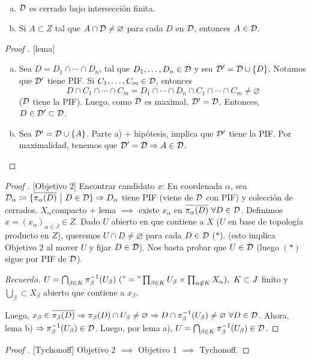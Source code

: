\begin{lemma}~
	\begin{enumerate}[a.]
		\item $\mathcal{D}$ es cerrado bajo intersección finita.

		\item Si $A \subset Z$ tal que $A \cap \mathcal{D} \neq \varnothing$ para cada $D$ en $\mathcal{D}$, entonces $A \in \mathcal{D}$.
	\end{enumerate}
\end{lemma}
\begin{proof}[Proof ][lema]
	\hfill{}
	\begin{enumerate}[a.]
		\item Sea $D = D_{1} \cap \cdots \cap D_{n}$, tal que $D_{1},\dots,D_{n} \in \mathcal{D}$ y sea $\mathcal{D}' = \mathcal{D} \cup \{D\}$. Notamos que $\mathcal{D}'$ tiene PIF. Si $C_{1},\dots,C_{m} \in \mathcal{D}$, entonces 
		\[ D \cap C_{1} \cap \cdots \cap C_{m} = D_{1} \cap \cdots \cap D_{n} \cap C_{1} \cap \cdots \cap C_{m} \neq \varnothing \]
		($\mathcal{D}$ tiene la PIF). Luego, como $\mathcal{D}$ es maximal, $\mathcal{D}' = \mathcal{D}$. Entonces, $D \in \mathcal{D}' \subset \mathcal{D}$.

		\item Sea $\mathcal{D}' = \mathcal{D} \cup \{A\}$. Parte a) + hipótesis, implica que $\mathcal{D}'$ tiene la PIF. Por maximalidad, tenemos que $\mathcal{D}' = \mathcal{D} \Rightarrow A \in \mathcal{D}$.
	\end{enumerate}
\end{proof}

\begin{proof}[Proof ][Objetivo 2]
	Encontrar candidato $x$: En coordenada $\alpha$, sea $\mathcal{D}_{\alpha} \coloneq \{\overline{\pi_{\alpha}(D)} \ \big| \ D \in \mathcal{D}\} \Rightarrow D_{\alpha}$ tiene PIF (viene de $\mathcal{D}$ con PIF) y colección de cerrados. $X_{\alpha}$compacto + lema $\implies$ existe $x_{\alpha}$ en $\overline{\pi_{\alpha}(D)} \ \forall D \in \mathcal{D}$. Definimos $x = (x_{\alpha})_{\alpha \in J} \in Z$. Dado $U$ abierto en que contiene a $X$ ($U$ en base de topología producto en $Z$), queremos $U \cap D \neq \varnothing$ para cada $D \in \mathcal{D}$ ($*$). (esto implica Objetivo 2 al mover $U$ y fijar $D \in \mathcal{D}$). Nos basta probar que $U \in \mathcal{D}$ (luego $(*)$ sigue por PIF de $\mathcal{D}$). \par
	\textit{Recuerdo.} $U = \bigcap_{\beta \in K} \pi_{\beta}^{-1}(U_{\beta}) \ ("=" \prod_{\beta \in K} U_{\beta} \times \prod_{\alpha \not\in K} X_{\alpha}),\ K \subset J$ finito y $\bigcup_{\beta} \subset X_{\beta}$ abierto que contiene a $x_{\beta}$. \par
	Luego, $x_{\beta} \in \overline{\pi_{\beta}(D)} \Rightarrow \pi_{\beta}(D) \cap U_{\beta} \neq \varnothing \Rightarrow D \cap \pi_{\beta}^{-1}(U_{\beta}) \neq \varnothing \ \forall D \in \mathcal{D}$. Ahora, lema b) $\Rightarrow \pi_{\beta}^{-1}(U_{\beta}) \in \mathcal{D}$. Luego, por lema a), $U = \bigcap_{\beta \in K} \pi_{\beta}^{-1}(U_{\beta}) \in \mathcal{D}$.
\end{proof}

\begin{proof}[Proof ][Tychonoff]
	Objetivo 2 $\implies$ Objetivo 1 $\implies$ Tychonoff.
\end{proof}
